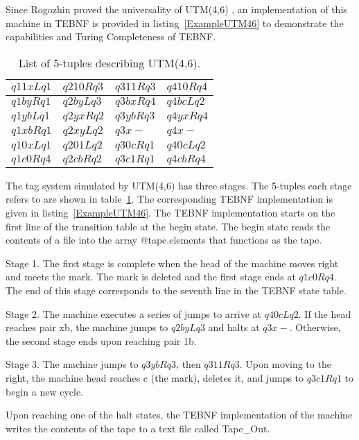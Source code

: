 \indent
Since Rogozhin proved the universality of UTM(4,6) \cite{rogozhin_01}, an implementation of this machine in TEBNF is provided in listing~\ref{ExampleUTM46} to demonstrate the capabilities and Turing Completeness of TEBNF.

\begin{table}[h]
\begin{center}
\caption{List of 5-tuples describing UTM(4,6).}
\label{FiveTuples}
\begin{tabular}{|l|l|l|l|} \hline
$q11xLq1$ & $q210Rq3$ & $q311Rq3$ & $q410Rq4$ \\ \hline
$q1byRq1$ & $q2byLq3$ & $q3bxRq4$ & $q4bcLq2$ \\ \hline
$q1ybLq1$ & $q2yxRq2$ & $q3ybRq3$ & $q4yxRq4$ \\ \hline
$q1xbRq1$ & $q2xyLq2$ & $q3x-$    & $q4x-   $ \\ \hline
$q10xLq1$ & $q201Lq2$ & $q30cRq1$ & $q40cLq2$ \\ \hline
$q1c0Rq4$ & $q2cbRq2$ & $q3c1Rq1$ & $q4cbRq4$ \\ \hline
\end{tabular}
\end{center}
\end{table}

The tag system simulated by UTM(4,6) \cite{rogozhin_01} has three stages.  The 5-tuples each stage refers to are shown in table~\ref{FiveTuples}.  The corresponding TEBNF implementation is given in listing~\ref{ExampleUTM46}. The TEBNF implementation starts on the first line of the transition table at the begin state.  The begin state reads the contents of a file into the array @tape.elements that functions as the tape.

\indent
Stage 1.  The first stage is complete when the head of the machine moves right and meets the mark.  The mark is deleted and the first stage ends at $q1c0Rq4$.  The end of this stage corresponds to the seventh line in the TEBNF state table.

\indent 
Stage 2.  The machine executes a series of jumps to arrive at $q40cLq2$.  If the head reaches pair xb, the machine jumps to $q2byLq3$ and halts at $q3x-$.  Otherwise, the second stage ends upon reaching pair 1b.

\indent
Stage 3.  The machine jumps to $q3ybRq3$, then $q311Rq3$.  Upon moving to the right, the machine head reaches c (the mark), deletes it, and jumps to $q3c1Rq1$  to begin a new cycle.

\indent
Upon reaching one of the halt states, the TEBNF implementation of the machine writes the contents of the tape to a text file called Tape\_Out. 

